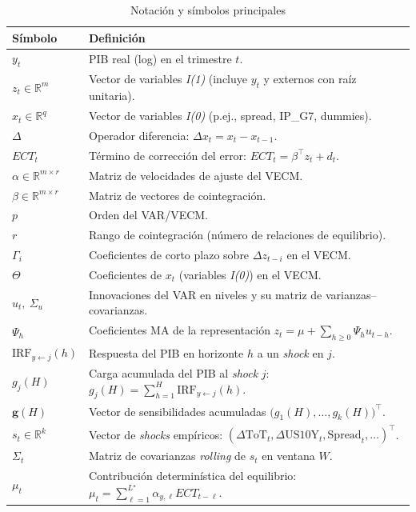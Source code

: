 \documentclass[11pt,a4paper]{article}
\newcommand{\R}{\mathbb{R}}
\newcommand{\1}{\mathbf{1}}
\newcommand{\vect}[1]{\boldsymbol{#1}}
\begin{document}
\begin{table}[h!]
\centering
\caption{Notación y símbolos principales}
\begin{tabular}{@{}p{3.3cm}p{11.5cm}@{}}
\toprule
Símbolo & Definición \\
\midrule
$y_t$ & PIB real (log) en el trimestre $t$. \\[2pt]
$z_t \in \R^{m}$ & Vector de variables \emph{I(1)} (incluye $y_t$ y externos con raíz unitaria). \\[2pt]
$x_t \in \R^{q}$ & Vector de variables \emph{I(0)} (p.ej., spread, IP\_G7, dummies). \\[2pt]
$\Delta$ & Operador diferencia: $\Delta x_t = x_t - x_{t-1}$. \\[2pt]
$ECT_t$ & Término de corrección del error: $ECT_t = \beta^\top z_t + d_t$. \\[2pt]
$\alpha \in \R^{m\times r}$ & Matriz de velocidades de ajuste del VECM. \\[2pt]
$\beta \in \R^{m\times r}$ & Matriz de vectores de cointegración. \\[2pt]
$p$ & Orden del VAR/VECM. \\[2pt]
$r$ & Rango de cointegración (número de relaciones de equilibrio). \\[2pt]
$\Gamma_i$ & Coeficientes de corto plazo sobre $\Delta z_{t-i}$ en el VECM. \\[2pt]
$\Theta$ & Coeficientes de $x_t$ (variables \emph{I(0)}) en el VECM. \\[2pt]
$u_t,\ \Sigma_u$ & Innovaciones del VAR en niveles y su matriz de varianzas--covarianzas. \\[2pt]
$\Psi_h$ & Coeficientes MA de la representación $z_t = \mu + \sum_{h\ge0}\Psi_h u_{t-h}$. \\[2pt]
$\text{IRF}_{y\leftarrow j}(h)$ & Respuesta del PIB en horizonte $h$ a un \emph{shock} en $j$. \\[2pt]
$g_j(H)$ & Carga acumulada del PIB al \emph{shock} $j$: $g_j(H)=\sum_{h=1}^H \text{IRF}_{y\leftarrow j}(h)$. \\[2pt]
$\vect{g}(H)$ & Vector de sensibilidades acumuladas $\big(g_1(H),\dots,g_k(H)\big)^\top$. \\[2pt]
$s_t \in \R^{k}$ & Vector de \emph{shocks} empíricos: $(\Delta \text{ToT}_t, \Delta \text{US10Y}_t, \text{Spread}_t, \ldots)^\top$. \\[2pt]
$\Sigma_t$ & Matriz de covarianzas \emph{rolling} de $s_t$ en ventana $W$. \\[2pt]
$\mu_t$ & Contribución determinística del equilibrio: $\mu_t=\sum_{\ell=1}^{L^\star}\alpha_{y,\ell} ECT_{t-\ell}$. \\[2pt]

\end{tabular}
\end{table}
\end{document}
